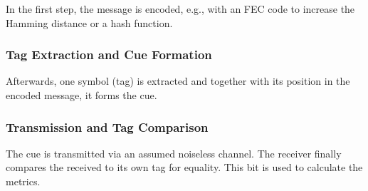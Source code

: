 \documentclass[%
  english,%
  paper=A1,%
  fontsize=22pt,%
  cdfoot=5ex,%
  ddcfoot,%
  BCOR=-20mm,
]{tudscrposter}
\begin{document}
\begin{multicols}{3}
In the first step, the message is encoded, e.g., with an FEC code to increase the Hamming distance or a hash function. 

\vspace{0.5cm}

\begin{tcolorbox}[colback=tagextraction!30, colframe=tagextraction, boxrule=0pt, left=0pt, right=0pt, top=2pt, bottom=2pt, enlarge left by=-\marginparsep, width=.33\textwidth]
\subsubsection*{Tag Extraction and Cue Formation}
\end{tcolorbox}

\vspace{-0.2cm}

Afterwards, one symbol (tag) is extracted and together with its position in the encoded message, it forms the cue.

\vspace{0.5cm}

\begin{tcolorbox}[colback=tagcomparison!30, colframe=tagcomparison, boxrule=0pt, left=0pt, right=0pt, top=2pt, bottom=2pt, enlarge left by=-\marginparsep, width=.33\textwidth]
\subsubsection*{Transmission and Tag Comparison}
\end{tcolorbox}

\vspace{-0.2cm}

The cue is transmitted via an assumed noiseless channel. The receiver finally compares the received to its own tag for equality. This bit is used to calculate the metrics.
\columnbreak


\end{multicols}
\end{document}
